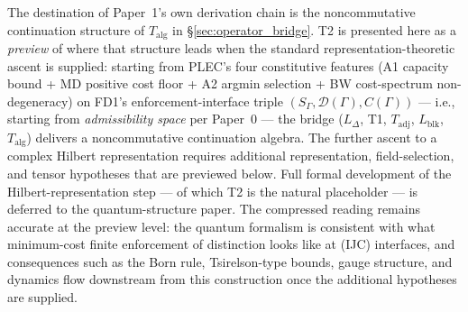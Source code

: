 \documentclass[11pt]{article}
\theoremstyle{remark}
\begin{document}
\smallskip\noindent The destination of Paper~1's own derivation chain is the noncommutative continuation structure of $T_{\mathrm{alg}}$ in \S\ref{sec:operator_bridge}. T2 is presented here as a \emph{preview} of where that structure leads when the standard representation-theoretic ascent is supplied: starting from PLEC's four constitutive features (A1 capacity bound + MD positive cost floor + A2 argmin selection + BW cost-spectrum non-degeneracy) on FD1's enforcement-interface triple $(S_\Gamma, \mathcal{D}(\Gamma), C(\Gamma))$ --- i.e., starting from \emph{admissibility space} per Paper~0 --- the bridge ($L_\Delta$, T1, $T_{\mathrm{adj}}$, $L_{\mathrm{blk}}$, $T_{\mathrm{alg}}$) delivers a noncommutative continuation algebra. The further ascent to a complex Hilbert representation requires additional representation, field-selection, and tensor hypotheses that are previewed below. Full formal development of the Hilbert-representation step --- of which T2 is the natural placeholder --- is deferred to the quantum-structure paper. The compressed reading remains accurate at the preview level: the quantum formalism is consistent with what minimum-cost finite enforcement of distinction looks like at (IJC) interfaces, and consequences such as the Born rule, Tsirelson-type bounds, gauge structure, and dynamics flow downstream from this construction once the additional hypotheses are supplied.
\end{document}
